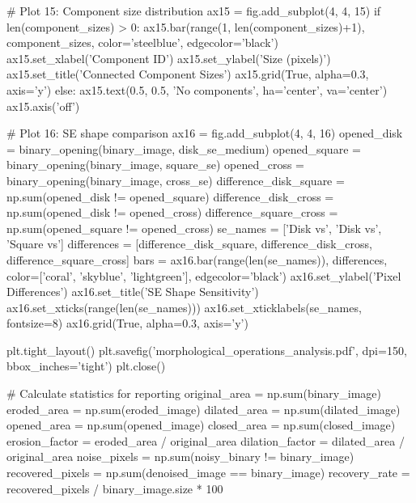 \documentclass[a4paper, 11pt]{article}
\begin{document}
\begin{pycode}
# Plot 15: Component size distribution
ax15 = fig.add_subplot(4, 4, 15)
if len(component_sizes) > 0:
    ax15.bar(range(1, len(component_sizes)+1), component_sizes, color='steelblue', edgecolor='black')
    ax15.set_xlabel('Component ID')
    ax15.set_ylabel('Size (pixels)')
    ax15.set_title('Connected Component Sizes')
    ax15.grid(True, alpha=0.3, axis='y')
else:
    ax15.text(0.5, 0.5, 'No components', ha='center', va='center')
    ax15.axis('off')

# Plot 16: SE shape comparison
ax16 = fig.add_subplot(4, 4, 16)
opened_disk = binary_opening(binary_image, disk_se_medium)
opened_square = binary_opening(binary_image, square_se)
opened_cross = binary_opening(binary_image, cross_se)
difference_disk_square = np.sum(opened_disk != opened_square)
difference_disk_cross = np.sum(opened_disk != opened_cross)
difference_square_cross = np.sum(opened_square != opened_cross)
se_names = ['Disk vs\nSquare', 'Disk vs\nCross', 'Square vs\nCross']
differences = [difference_disk_square, difference_disk_cross, difference_square_cross]
bars = ax16.bar(range(len(se_names)), differences, color=['coral', 'skyblue', 'lightgreen'],
                edgecolor='black')
ax16.set_ylabel('Pixel Differences')
ax16.set_title('SE Shape Sensitivity')
ax16.set_xticks(range(len(se_names)))
ax16.set_xticklabels(se_names, fontsize=8)
ax16.grid(True, alpha=0.3, axis='y')

plt.tight_layout()
plt.savefig('morphological_operations_analysis.pdf', dpi=150, bbox_inches='tight')
plt.close()

# Calculate statistics for reporting
original_area = np.sum(binary_image)
eroded_area = np.sum(eroded_image)
dilated_area = np.sum(dilated_image)
opened_area = np.sum(opened_image)
closed_area = np.sum(closed_image)
erosion_factor = eroded_area / original_area
dilation_factor = dilated_area / original_area
noise_pixels = np.sum(noisy_binary != binary_image)
recovered_pixels = np.sum(denoised_image == binary_image)
recovery_rate = recovered_pixels / binary_image.size * 100
\end{pycode}
\end{document}
